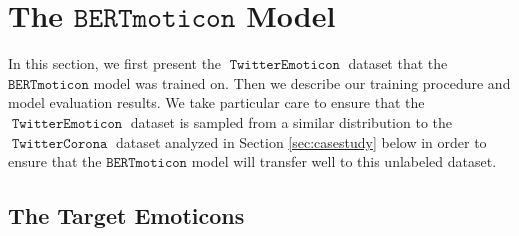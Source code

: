 \documentclass[11pt]{article}
\newcommand{\XXX}{{\textbf{XXX}}~}
\newcommand{\bertmoji}{\texttt{BERTmoticon}}
\DeclareMathOperator{\emoticon}{\texttt{TwitterEmoticon}}
\DeclareMathOperator{\corona}{\texttt{TwitterCorona}}
\begin{document}

\section{The $\bertmoji$ Model}
\label{sec:bertmoji}

In this section, we first present the $\emoticon$ dataset that the $\bertmoji$ model was trained on.
Then we describe our training procedure and model evaluation results.
We take particular care to ensure that the $\emoticon$ dataset is sampled from a similar distribution to the $\corona$ dataset analyzed in Section \ref{sec:casestudy} below in order to ensure that the $\bertmoji$ model will transfer well to this unlabeled dataset.


\subsection{The Target Emoticons}
\end{document}
